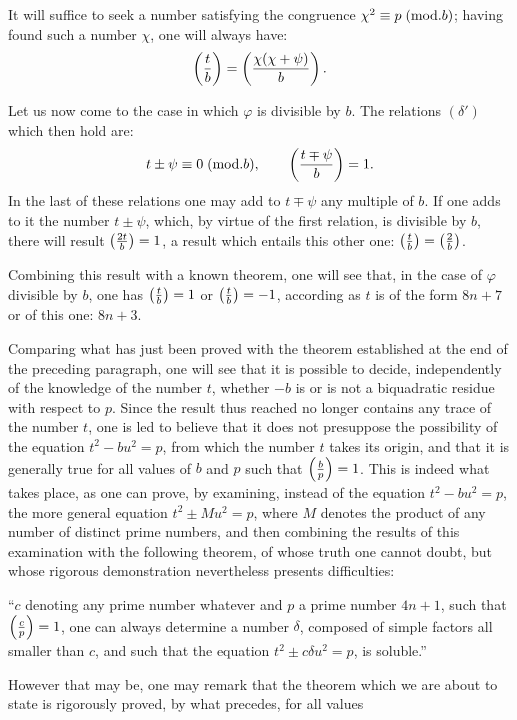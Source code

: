 \par\noindent
It will suffice to seek a number satisfying the congruence $\chi^2\equiv p\;(\mathrm{mod}.b)$; having found
such a number $\chi$, one will always have:
\[
\left(\frac{t}{b}\right)=\left(\frac{\chi(\chi+\psi)}{b}\right).
\]
\par\indent
Let us now come to the case in which $\varphi$ is divisible by $b$. The relations $(\delta')$
which then hold are:
\[
t\pm\psi\equiv0\;(\mathrm{mod}.b),\qquad
\left(\frac{t\mp\psi}{b}\right)=1.
\]
In the last of these relations one may add to $t\mp\psi$ any multiple of $b$. If one adds to it
the number $t\pm\psi$, which, by virtue of the first relation, is divisible by $b$, there will
result $\left(\frac{2t}{b}\right)=1$, a result which entails this other one: $\left(\frac{t}{b}\right)=\left(\frac{2}{b}\right)$.
\par\indent
Combining this result with a known theorem, one will see that, in the case of $\varphi$ divisible
by $b$, one has $\left(\frac{t}{b}\right)=1$ or $\left(\frac{t}{b}\right)=-1$, according as $t$ is of the form $8n+7$ or of
this one: $8n+3$.
\par\indent
Comparing what has just been proved with the theorem established at the end of the preceding
paragraph, one will see that it is possible to decide, independently of the knowledge of the
number $t$, whether $-b$ is or is not a biquadratic residue with respect to $p$. Since the result
thus reached no longer contains any trace of the number $t$, one is led to believe that it does
not presuppose the possibility of the equation $t^2-bu^2=p$, from which the number $t$ takes its
origin, and that it is generally true for all values of $b$ and $p$ such that $\left(\frac{b}{p}\right)=1$. This
is indeed what takes place, as one can prove, by examining, instead of the equation $t^2-bu^2=p$,
the more general equation $t^2\pm Mu^2=p$, where $M$ denotes the product of any number of distinct
prime numbers, and then combining the results of this examination with the following theorem, of
whose truth one cannot doubt, but whose rigorous demonstration nevertheless presents difficulties:
\par\indent
“$c$ denoting any prime number whatever and $p$ a prime number $4n+1$, such that $\left(\frac{c}{p}\right)=1$,
one can always determine a number $\delta$, composed of simple factors all smaller than $c$, and
such that the equation $t^2\pm c\delta u^2=p$, is soluble.”
\par\indent
However that may be, one may remark that the theorem which we are about to state is rigorously
proved, by what precedes, for all values

